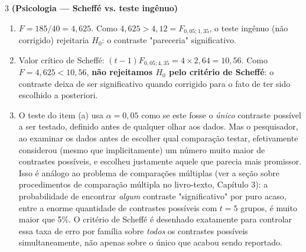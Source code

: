 \documentclass[11pt]{article}
\begin{document}
\begin{questao}{3} \textbf{(Psicologia --- Scheffé vs. teste ingênuo)}
\end{questao}
\begin{solucao}
\begin{enumerate}[label=(\alph*)]
  \item $F = 185/40 = 4{,}625$. Como $4{,}625 > 4{,}12 = F_{0{,}05;1,35}$, o teste ingênuo (não
    corrigido) rejeitaria $H_0$: o contraste "pareceria" significativo.
  \item Valor crítico de Scheffé: $(t-1)F_{0{,}05;4,35} = 4 \times 2{,}64 = 10{,}56$. Como
    $F = 4{,}625 < 10{,}56$, \textbf{não rejeitamos $H_0$ pelo critério de Scheffé}: o contraste
    deixa de ser significativo quando corrigido para o fato de ter sido escolhido a posteriori.
  \item O teste do item (a) usa $\alpha = 0{,}05$ como se este fosse o \emph{único} contraste
    possível a ser testado, definido antes de qualquer olhar aos dados. Mas o pesquisador, ao
    examinar os dados antes de escolher qual comparação testar, efetivamente considerou (mesmo
    que implicitamente) um número muito maior de contrastes possíveis, e escolheu justamente
    aquele que parecia mais promissor. Isso é análogo ao problema de comparações múltiplas
    (ver a seção sobre procedimentos de comparação múltipla no livro-texto, Capítulo 3): a
    probabilidade de encontrar \emph{algum}
    contraste "significativo" por puro acaso, entre a enorme quantidade de contrastes possíveis
    com $t=5$ grupos, é muito maior que 5\%. O critério de Scheffé é desenhado exatamente para
    controlar essa taxa de erro por família sobre \emph{todos} os contrastes possíveis
    simultaneamente, não apenas sobre o único que acabou sendo reportado.
\end{enumerate}
\end{solucao}
\end{document}
